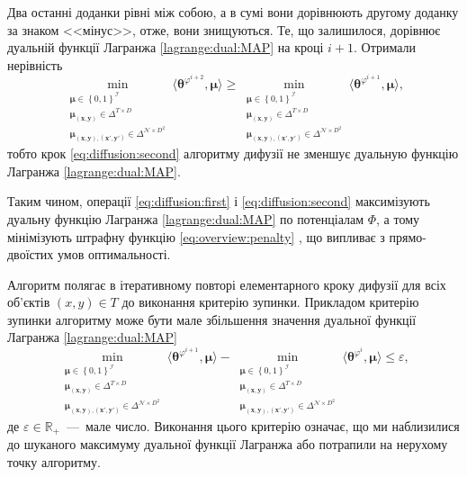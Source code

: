 Два останні доданки рівні між собою,
а в сумі вони дорівнюють другому доданку за знаком <<мінус>>, отже,
вони знищуються.
Те, що залишилося, дорівнює дуальній функції Лагранжа \eqref{lagrange:dual:MAP}
на кроці $i + 1$.
Отримали нерівність
\begin{equation*}
    \min \limits_{\substack{\pmb{\mu} \in \left\{ 0, 1 \right\}^{\mathcal{I}} \\
                            \pmb{\mu_{\left(x, y \right)}} \in \Delta^{T \times D} \\
                            \pmb{\mu_{\left(x, y \right), \left(x', y' \right)}} \in
                                \Delta^{\mathcal{N} \times D^2}}}
        \langle \pmb{\theta}^{\varphi^{i + 2}}, \pmb{\mu} \rangle \ge
    \min \limits_{\substack{\pmb{\mu} \in \left\{ 0, 1 \right\}^{\mathcal{I}} \\
                            \pmb{\mu_{\left(x, y \right)}} \in \Delta^{T \times D} \\
                            \pmb{\mu_{\left(x, y \right), \left(x', y' \right)}} \in
                                \Delta^{\mathcal{N} \times D^2}}}
        \langle \pmb{\theta}^{\varphi^{i + 1}}, \pmb{\mu} \rangle,
\end{equation*}
тобто крок \eqref{eq:diffusion:second}
алгоритму дифузії не зменшує дуальную функцію Лагранжа
\eqref{lagrange:dual:MAP}.

Таким чином,
операції \ref{eq:diffusion:first} і
\ref{eq:diffusion:second} максимізують дуальну функцію Лагранжа
\eqref{lagrange:dual:MAP} по потенціалам
$\Phi$, а тому мінімізують штрафну функцію \ref{eq:overview:penalty}
\cite{overview:savchynskyy:diffusion},
що випливає з прямо-двоїстих умов оптимальності.

Алгоритм полягає в ітеративному повторі елементарного кроку дифузії для всіх об'єктів
$\left(x, y \right) \in T$ до виконання критерію зупинки.
Прикладом критерію зупинки алгоритму може бути мале збільшення
значення дуальної функції Лагранжа \eqref{lagrange:dual:MAP}
\begin{equation*}
    \min \limits_{\substack{\pmb{\mu} \in \left\{ 0, 1 \right\}^{\mathcal{I}} \\
                            \pmb{\mu_{\left(x, y \right)}} \in \Delta^{T \times D} \\
                            \pmb{\mu_{\left(x, y \right), \left(x', y' \right)}} \in
                                \Delta^{\mathcal{N} \times D^2}}}
        \langle \pmb{\theta}^{\varphi^{i + 1}}, \pmb{\mu} \rangle -
    \min \limits_{\substack{\pmb{\mu} \in \left\{ 0, 1 \right\}^{\mathcal{I}} \\
                            \pmb{\mu_{\left(x, y \right)}} \in \Delta^{T \times D} \\
                            \pmb{\mu_{\left(x, y \right), \left(x', y' \right)}} \in
                                \Delta^{\mathcal{N} \times D^2}}}
        \langle \pmb{\theta}^{\varphi^i}, \pmb{\mu} \rangle \le \varepsilon,
\end{equation*}
де $\varepsilon \in \mathbb{R}_+$~---~мале число.
Виконання цього критерію означає,
що ми наблизилися до шуканого максимуму дуальної функції Лагранжа
або потрапили на нерухому точку алгоритму.

